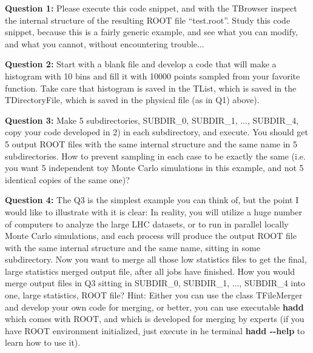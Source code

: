 \documentclass[11pt]{article}
\begin{document}
\noindent\textbf{Question 1:} Please execute this code snippet, and with the TBrowser inspect the internal structure of the resulting ROOT file ``test.root''. Study this code snippet, because this is a fairly generic example, and see what you can modify, and what you cannot, without encountering trouble...

\vspace{0.144cm}

\noindent\textbf{Question 2:} Start with a blank file and develop a code that will make a histogram with 10 bins and fill it with 10000 points sampled from your favorite function. Take care that histogram is saved in the TList, which is saved in the TDirectoryFile, which is saved in the physical file (as in Q1) above).

\vspace{0.144cm}

\noindent\textbf{Question 3:} Make 5 subdirectories, SUBDIR\_0,  SUBDIR\_1, ...,  SUBDIR\_4, copy your code developed in 2) in each subdirectory, and execute. You should get 5 output ROOT files with the same internal structure and the same name in 5 subdirectories. How to prevent sampling in each case to be exactly the same (i.e. you want 5 independent toy Monte Carlo simulations in this example, and not 5 identical copies of the same one)?

\vspace{0.144cm}

\noindent\textbf{Question 4:} The Q3 is the simplest example you can think of, but the point I would like to illustrate with it is clear: In reality, you will utilize a huge number of computers to analyze the large LHC datasets, or to run in parallel locally Monte Carlo simulations, and each process will produce the output ROOT file with the same internal structure and the same name, sitting in some subdirectory. Now you want to merge all those low statistics files to get the final, large statistics merged output file, after all jobs have finished. How you would merge output files in Q3 sitting in SUBDIR\_0, SUBDIR\_1, ...,  SUBDIR\_4 into one, large statistics, ROOT file? Hint: Either you can use the class TFileMerger and develop your own code for merging, or better, you can use executable {\bf hadd} which comes with ROOT, and which is developed for merging by experts (if you have ROOT environment initialized, just execute in he terminal {\bf hadd \--\--help} to learn how to use it).    

\vspace{0.144cm}
\end{document}
